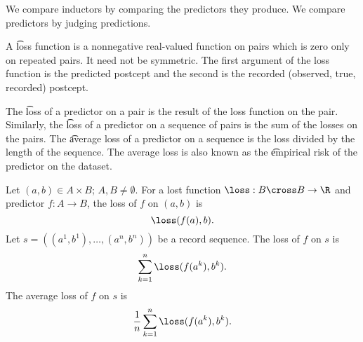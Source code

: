 

We compare inductors by comparing the predictors they produce.
We compare predictors by judging predictions.


A \t{loss} function is a nonnegative real-valued function on pairs which is zero only on repeated pairs.
It need not be symmetric.
The first argument of the loss function is the predicted postcept and the second is the recorded (observed, true, recorded) postcept.

The \t{loss of a predictor on a pair} is the result of the loss function on the pair.
Similarly, the \t{loss of a predictor on  a sequence} of pairs is the sum of the losses on the pairs.
The \t{average loss of a predictor on a sequence} is the loss divided by the length of the sequence.
The average loss is also known as the \t{empirical risk} of the predictor on the dataset.


Let $(a, b) \in A \times B$; $A, B \neq \emptyset$.
For a lost function $\loss: B \cross B \to \R$ and predictor $f: A \to B$, the loss of $f$ on $(a, b)$ is
\[
  \loss(f(a),b).
\]
Let $s = ((a^1, b^1), \dots, (a^n, b^n))$
be a record sequence.
The loss of $f$ on $s$ is
\[
  \sum_{k = 1}^{n} \loss(f(a^k), b^k).
\]
The average loss of $f$ on $s$ is
\[
  \frac{1}{n} \sum_{k = 1}^{n} \loss(f(a^k), b^k).
\]
